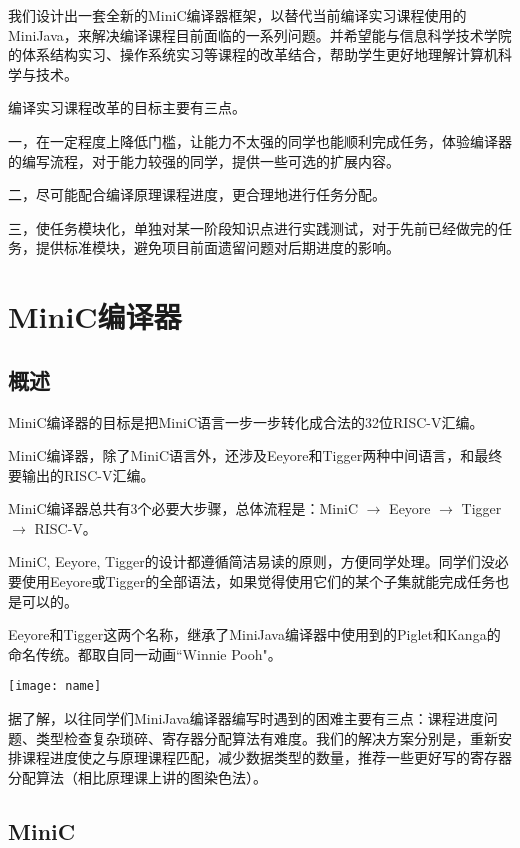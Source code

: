 \documentclass{ctexart}
\begin{document}
我们设计出一套全新的MiniC编译器框架，以替代当前编译实习课程使用的MiniJava，来解决编译课程目前面临的一系列问题。并希望能与信息科学技术学院的体系结构实习、操作系统实习等课程的改革结合，帮助学生更好地理解计算机科学与技术。

编译实习课程改革的目标主要有三点。

一，在一定程度上降低门槛，让能力不太强的同学也能顺利完成任务，体验编译器的编写流程，对于能力较强的同学，提供一些可选的扩展内容。

二，尽可能配合编译原理课程进度，更合理地进行任务分配。

三，使任务模块化，单独对某一阶段知识点进行实践测试，对于先前已经做完的任务，提供标准模块，避免项目前面遗留问题对后期进度的影响。

\newpage
\section{MiniC编译器}

\subsection{概述}

MiniC编译器的目标是把MiniC语言一步一步转化成合法的32位RISC-V汇编。

MiniC编译器，除了MiniC语言外，还涉及Eeyore和Tigger两种中间语言，和最终要输出的RISC-V汇编。

MiniC编译器总共有3个必要大步骤，总体流程是：MiniC $\rightarrow$ Eeyore $\rightarrow$ Tigger $\rightarrow$ RISC-V。

MiniC, Eeyore, Tigger的设计都遵循简洁易读的原则，方便同学处理。同学们没必要使用Eeyore或Tigger的全部语法，如果觉得使用它们的某个子集就能完成任务也是可以的。%

Eeyore和Tigger这两个名称，继承了MiniJava编译器中使用到的Piglet和Kanga的命名传统。都取自同一动画``Winnie Pooh"。

\begin{center}\texttt{[image: name]} \end{center}

据了解，以往同学们MiniJava编译器编写时遇到的困难主要有三点：课程进度问题、类型检查复杂琐碎、寄存器分配算法有难度。我们的解决方案分别是，重新安排课程进度使之与原理课程匹配，减少数据类型的数量，推荐一些更好写的寄存器分配算法（相比原理课上讲的图染色法）。

\subsection{MiniC}
\end{document}
